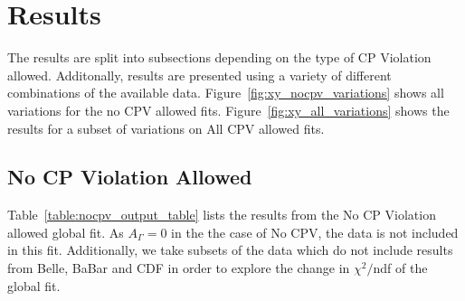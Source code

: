 \section{Results}
\label{sec:Results}
The results are split into subsections depending on the type of CP Violation allowed.
Additonally, results are presented using a variety of different combinations of the
available data. Figure~\ref{fig:xy_nocpv_variations} shows all variations for the 
no CPV allowed fits. Figure~\ref{fig:xy_all_variations} shows the results for a 
subset of variations on All CPV allowed fits. 
\subsection{No CP Violation Allowed}
Table~\ref{table:nocpv_output_table} lists the results from the No CP Violation allowed
global fit. As $A_\Gamma =0$ in the the case of No CPV, the data is not included in 
this fit. Additionally, we take subsets of the data which do not include results from
Belle, BaBar and CDF in order to explore the change in $\chi^2/$ndf of the global fit.


